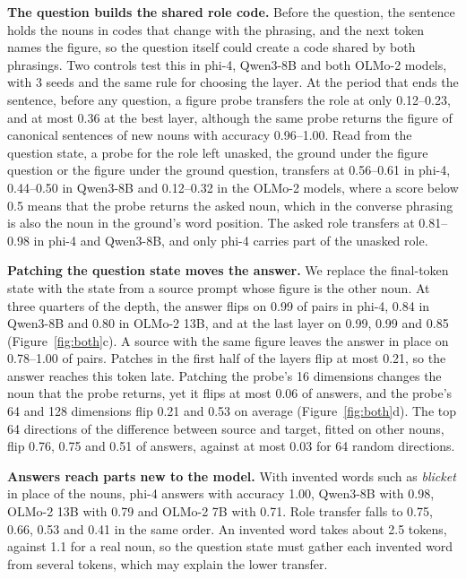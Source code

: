 \documentclass[10pt]{article}
\theoremstyle{plain}
\theoremstyle{remark}
\begin{document}
\textbf{The question builds the shared role code.} Before the question, the sentence holds the nouns in codes that change with the phrasing, and the next token names the figure, so the question itself could create a code shared by both phrasings. Two controls test this in phi-4, Qwen3-8B and both OLMo-2 models, with 3 seeds and the same rule for choosing the layer. At the period that ends the sentence, before any question, a figure probe transfers the role at only 0.12--0.23, and at most 0.36 at the best layer, although the same probe returns the figure of canonical sentences of new nouns with accuracy 0.96--1.00. Read from the question state, a probe for the role left unasked, the ground under the figure question or the figure under the ground question, transfers at 0.56--0.61 in phi-4, 0.44--0.50 in Qwen3-8B and 0.12--0.32 in the OLMo-2 models, where a score below 0.5 means that the probe returns the asked noun, which in the converse phrasing is also the noun in the ground's word position. The asked role transfers at 0.81--0.98 in phi-4 and Qwen3-8B, and only phi-4 carries part of the unasked role.

\textbf{Patching the question state moves the answer.} We replace the final-token state with the state from a source prompt whose figure is the other noun. At three quarters of the depth, the answer flips on 0.99 of pairs in phi-4, 0.84 in Qwen3-8B and 0.80 in OLMo-2 13B, and at the last layer on 0.99, 0.99 and 0.85 (Figure~\ref{fig:both}c). A source with the same figure leaves the answer in place on 0.78--1.00 of pairs. Patches in the first half of the layers flip at most 0.21, so the answer reaches this token late. Patching the probe's 16 dimensions changes the noun that the probe returns, yet it flips at most 0.06 of answers, and the probe's 64 and 128 dimensions flip 0.21 and 0.53 on average (Figure~\ref{fig:both}d). The top 64 directions of the difference between source and target, fitted on other nouns, flip 0.76, 0.75 and 0.51 of answers, against at most 0.03 for 64 random directions.

\textbf{Answers reach parts new to the model.} With invented words such as \emph{blicket} in place of the nouns, phi-4 answers with accuracy 1.00, Qwen3-8B with 0.98, OLMo-2 13B with 0.79 and OLMo-2 7B with 0.71. Role transfer falls to 0.75, 0.66, 0.53 and 0.41 in the same order. An invented word takes about 2.5 tokens, against 1.1 for a real noun, so the question state must gather each invented word from several tokens, which may explain the lower transfer.
\end{document}
